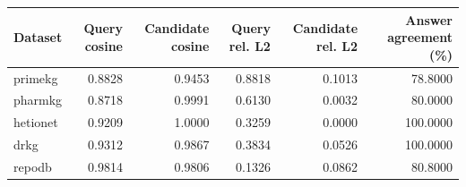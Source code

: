 \begin{tabular}{lrrrrr}
\hline
Dataset & Query cosine & Candidate cosine & Query rel. L2 & Candidate rel. L2 & Answer agreement (\%) \\
\hline
primekg & 0.8828 & 0.9453 & 0.8818 & 0.1013 & 78.8000 \\
pharmkg & 0.8718 & 0.9991 & 0.6130 & 0.0032 & 80.0000 \\
hetionet & 0.9209 & 1.0000 & 0.3259 & 0.0000 & 100.0000 \\
drkg & 0.9312 & 0.9867 & 0.3834 & 0.0526 & 100.0000 \\
repodb & 0.9814 & 0.9806 & 0.1326 & 0.0862 & 80.8000 \\
\hline
\end{tabular}